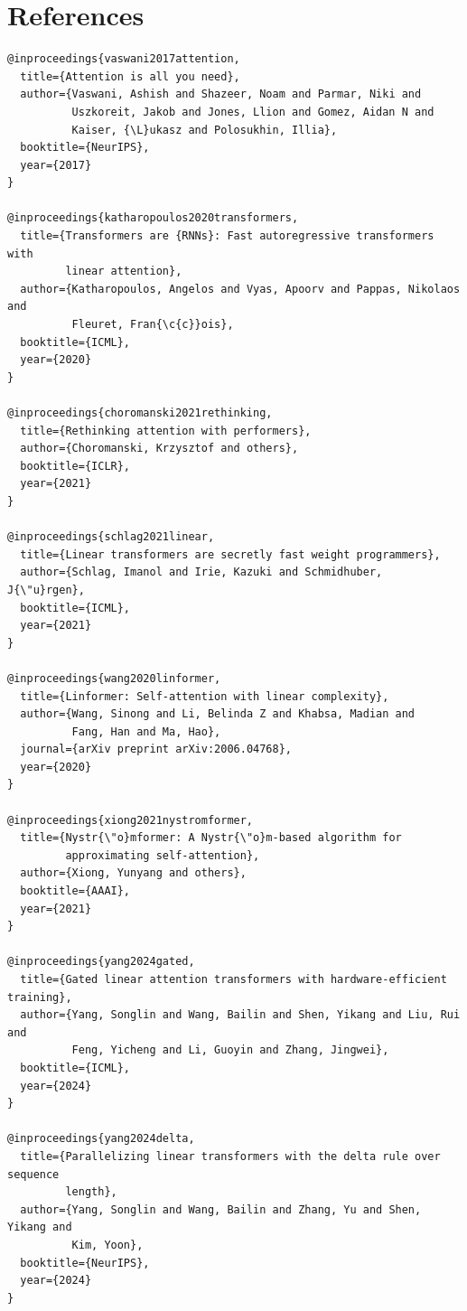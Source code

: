 
\section{References}

\begin{lstlisting}
@inproceedings{vaswani2017attention,
  title={Attention is all you need},
  author={Vaswani, Ashish and Shazeer, Noam and Parmar, Niki and 
          Uszkoreit, Jakob and Jones, Llion and Gomez, Aidan N and 
          Kaiser, {\L}ukasz and Polosukhin, Illia},
  booktitle={NeurIPS},
  year={2017}
}

@inproceedings{katharopoulos2020transformers,
  title={Transformers are {RNNs}: Fast autoregressive transformers with 
         linear attention},
  author={Katharopoulos, Angelos and Vyas, Apoorv and Pappas, Nikolaos and 
          Fleuret, Fran{\c{c}}ois},
  booktitle={ICML},
  year={2020}
}

@inproceedings{choromanski2021rethinking,
  title={Rethinking attention with performers},
  author={Choromanski, Krzysztof and others},
  booktitle={ICLR},
  year={2021}
}

@inproceedings{schlag2021linear,
  title={Linear transformers are secretly fast weight programmers},
  author={Schlag, Imanol and Irie, Kazuki and Schmidhuber, J{\"u}rgen},
  booktitle={ICML},
  year={2021}
}

@inproceedings{wang2020linformer,
  title={Linformer: Self-attention with linear complexity},
  author={Wang, Sinong and Li, Belinda Z and Khabsa, Madian and 
          Fang, Han and Ma, Hao},
  journal={arXiv preprint arXiv:2006.04768},
  year={2020}
}

@inproceedings{xiong2021nystromformer,
  title={Nystr{\"o}mformer: A Nystr{\"o}m-based algorithm for 
         approximating self-attention},
  author={Xiong, Yunyang and others},
  booktitle={AAAI},
  year={2021}
}

@inproceedings{yang2024gated,
  title={Gated linear attention transformers with hardware-efficient training},
  author={Yang, Songlin and Wang, Bailin and Shen, Yikang and Liu, Rui and 
          Feng, Yicheng and Li, Guoyin and Zhang, Jingwei},
  booktitle={ICML},
  year={2024}
}

@inproceedings{yang2024delta,
  title={Parallelizing linear transformers with the delta rule over sequence 
         length},
  author={Yang, Songlin and Wang, Bailin and Zhang, Yu and Shen, Yikang and 
          Kim, Yoon},
  booktitle={NeurIPS},
  year={2024}
}


\end{lstlisting}
